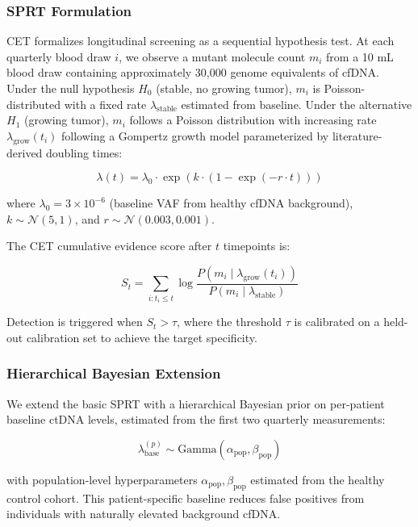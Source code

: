 \documentclass[10pt,a4paper]{article}
\begin{document}
\subsubsection{SPRT Formulation}

CET formalizes longitudinal screening as a sequential hypothesis test. At each quarterly blood draw $i$, we observe a mutant molecule count $m_i$ from a 10 mL blood draw containing approximately 30,000 genome equivalents of cfDNA. Under the null hypothesis $H_0$ (stable, no growing tumor), $m_i$ is Poisson-distributed with a fixed rate $\lambda_{\text{stable}}$ estimated from baseline. Under the alternative $H_1$ (growing tumor), $m_i$ follows a Poisson distribution with increasing rate $\lambda_{\text{grow}}(t_i)$ following a Gompertz growth model parameterized by literature-derived doubling times:

\begin{equation}
\lambda(t) = \lambda_0 \cdot \exp\left(k \cdot (1 - \exp(-r \cdot t))\right)
\end{equation}

where $\lambda_0 = 3 \times 10^{-6}$ (baseline VAF from healthy cfDNA background), $k \sim \mathcal{N}(5, 1)$, and $r \sim \mathcal{N}(0.003, 0.001)$.

The CET cumulative evidence score after $t$ timepoints is:

\begin{equation}
S_t = \sum_{i: t_i \leq t} \log \frac{P(m_i \mid \lambda_{\text{grow}}(t_i))}{P(m_i \mid \lambda_{\text{stable}})}
\label{eq:cet_score}
\end{equation}

Detection is triggered when $S_t > \tau$, where the threshold $\tau$ is calibrated on a held-out calibration set to achieve the target specificity.

\subsubsection{Hierarchical Bayesian Extension}

We extend the basic SPRT with a hierarchical Bayesian prior on per-patient baseline ctDNA levels, estimated from the first two quarterly measurements:

\begin{equation}
\lambda_{\text{base}}^{(p)} \sim \text{Gamma}\left(\alpha_{\text{pop}}, \beta_{\text{pop}}\right)
\end{equation}

with population-level hyperparameters $\alpha_{\text{pop}}, \beta_{\text{pop}}$ estimated from the healthy control cohort. This patient-specific baseline reduces false positives from individuals with naturally elevated background cfDNA.
\end{document}
